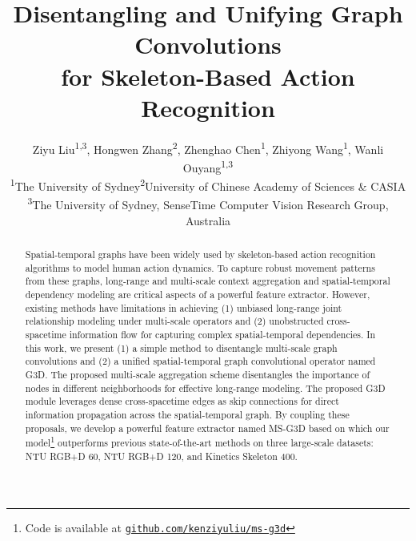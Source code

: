 \documentclass[10pt,twocolumn,letterpaper]{article}
\begin{document}
\setlength{\skip\footins}{10pt}

\title{Disentangling and Unifying Graph Convolutions\\for Skeleton-Based Action Recognition}

\author{
Ziyu Liu\textsuperscript{1,3}, Hongwen Zhang\textsuperscript{2}, Zhenghao Chen\textsuperscript{1}, Zhiyong Wang\textsuperscript{1}, Wanli Ouyang\textsuperscript{1,3}\\
{\textsuperscript{1}The University of Sydney\quad \textsuperscript{2}University of Chinese Academy of Sciences \& CASIA}\\
{\textsuperscript{3}The University of Sydney, SenseTime Computer Vision Research Group, Australia}
\\
}

\maketitle
\thispagestyle{empty}

\begin{abstract}
Spatial-temporal graphs have been widely used by skeleton-based action recognition algorithms to model human action dynamics.
To capture robust movement patterns from these graphs, long-range and multi-scale context aggregation and spatial-temporal dependency modeling are critical aspects of a powerful feature extractor.
However, existing methods have limitations in achieving (1) unbiased long-range joint relationship modeling under multi-scale operators and (2) unobstructed cross-spacetime information flow for capturing complex spatial-temporal dependencies.
In this work, we present (1) a simple method to disentangle multi-scale graph convolutions and (2) a unified spatial-temporal graph convolutional operator named G3D.
The proposed multi-scale aggregation scheme disentangles the importance of nodes in different neighborhoods for effective long-range modeling.
The proposed G3D module leverages dense cross-spacetime edges as skip connections for direct information propagation across the spatial-temporal graph.
By coupling these proposals, we develop a powerful feature extractor named MS-G3D based on which our model\footnote{Code is available at \href{https://github.com/kenziyuliu/ms-g3d}{\tt github.com/kenziyuliu/ms-g3d}} outperforms previous state-of-the-art methods on three large-scale datasets: NTU RGB+D 60, NTU RGB+D 120, and Kinetics Skeleton 400.
\end{abstract}
\end{document}
